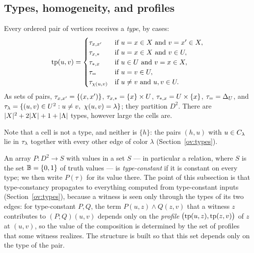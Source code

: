 \subsection{Types, homogeneity, and profiles}\label{sec:types}
Every ordered pair of vertices receives a \emph{type}, by cases:
\begin{equation}\label{eq:types}
 \operatorname{tp}(u,v)=
 \begin{cases}
  \tau_{x,x'}&\text{if }u=x\in X\text{ and }v=x'\in X,\\
  \tau_{x,\ast}&\text{if }u=x\in X\text{ and }v\in U,\\
  \tau_{\ast,x}&\text{if }u\in U\text{ and }v=x\in X,\\
  \tau_{=}&\text{if }u=v\in U,\\
  \tau_{\chi(u,v)}&\text{if }u\ne v\text{ and }u,v\in U.
 \end{cases}
\end{equation}
As sets of pairs, $\tau_{x,x'}=\{(x,x')\}$, $\tau_{x,\ast}=\{x\}\times U$,
$\tau_{\ast,x}=U\times\{x\}$, $\tau_{=}=\Delta_U$, and
$\ctype\lambda=\{(u,v)\in U^2:u\ne v,\ \colr(u,v)=\lambda\}$; they partition
$D^2$. There are $|X|^2+2|X|+1+|\Lambda|$ types, however large the cells are.

Note that a cell is not a type, and neither is $\{h\}$: the pairs $(h,u)$
with $u\in C_{\lambda}$ lie in $\tau_{\lambda}$ together with every other
edge of color $\lambda$ (Section~\ref{ov:types}).

An array $P:D^2\to S$ with values in a set $S$ --- in particular a relation,
where $S$ is the set $\mathbb B=\{0,1\}$ of truth values --- is
\emph{type-constant} if it is constant on every type;
we then write $P(\tau)$ for its value there. The point of this subsection is
that type-constancy propagates to everything computed from type-constant
inputs (Section~\ref{ov:types}), because a witness is seen only through the
types of its two edges: for type-constant $P,Q$, the term
$P(u,z)\land Q(z,v)$ that a witness $z$ contributes to $(P;Q)(u,v)$ depends
only on the \emph{profile} $\bigl(\operatorname{tp}(u,z),\operatorname{tp}(z,v)\bigr)$ of $z$ at
$(u,v)$, so the value of the composition is determined by the set of
profiles that some witness realizes. The structure is built so that this
set depends only on the type of the pair.


